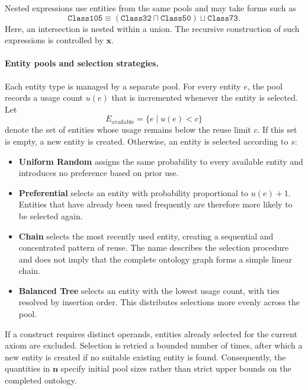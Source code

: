 Nested expressions use entities from the same pools and may take forms
such as
\[
\texttt{Class105}\equiv
(\texttt{Class32}\sqcap\texttt{Class50})
\sqcup\texttt{Class73}.
\]
Here, an intersection is nested within a union. The recursive construction
of such expressions is controlled by $\mathbf{x}$.


\paragraph{Entity pools and selection strategies.}

Each entity type is managed by a separate pool. For every entity $e$, the
pool records a usage count $u(e)$ that is incremented whenever the entity
is selected. Let
\[
E_{\mathrm{available}}
=
\{e\mid u(e)<c\}
\]
denote the set of entities whose usage remains below the reuse limit $c$.
If this set is empty, a new entity is created. Otherwise, an entity is
selected according to $s$:

\begin{itemize}

\item \textbf{Uniform Random} assigns the same probability to every
available entity and introduces no preference based on prior use.

\item \textbf{Preferential} selects an entity with probability proportional
to $u(e)+1$. Entities that have already been used frequently are therefore
more likely to be selected again.

\item \textbf{Chain} selects the most recently used entity, creating a
sequential and concentrated pattern of reuse. The name describes the
selection procedure and does not imply that the complete ontology graph
forms a simple linear chain.

\item \textbf{Balanced Tree} selects an entity with the lowest usage count,
with ties resolved by insertion order. This distributes selections more
evenly across the pool.

\end{itemize}

If a construct requires distinct operands, entities already selected for
the current axiom are excluded. Selection is retried a bounded number of
times, after which a new entity is created if no suitable existing entity
is found. Consequently, the quantities in $\mathbf{n}$ specify initial
pool sizes rather than strict upper bounds on the completed ontology.


